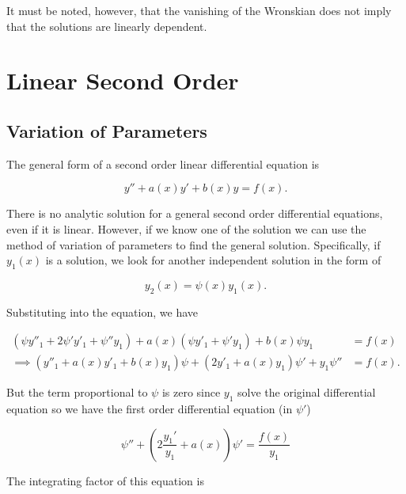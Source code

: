 \documentclass[english,a4paper,12pt]{report}
\begin{document}
It must be noted, however, that the vanishing of the Wronskian does not imply that the solutions are linearly dependent.

\section{Linear Second Order}

\subsection{Variation of Parameters}\label{vp} 

The general form of a second order linear differential equation is

\begin{equation}
    y'' + a(x) y' + b(x)y = f(x).
\end{equation}

There is no analytic solution for a general second order differential equations, even if it is linear. However, if we know one of the solution we can use the method of variation of parameters to find the general solution. Specifically, if \(y_1 (x)\) is a solution, we look for another independent solution in the form of

\begin{equation}
    y_{2} (x) = \psi (x) y_{1}(x).   
\end{equation}

Substituting into the equation, we have

\begin{equation}
    \begin{aligned}
     (\psi y''_{1} + 2\psi 'y'_{1} + \psi ''y_{1}) + a(x) (\psi y'_{1} + \psi ' y_{1}) + b(x) \psi y_{1} &= f(x) \\
    \implies ( y''_{1} + a(x) y'_{1} + b(x)y_{1}   ) \psi + (2 y'_{1} + a(x) y_{1}) \psi ' +  y_{1}\psi '' &= f(x). 
    \end{aligned}
\end{equation}

But the term proportional to \(\psi \) is zero since \(y_{1} \) solve the original differential equation so we have the first order differential equation (in \(\psi '\))

\begin{equation} \label{psi'} 
    \psi '' + \left( 2 \frac{y_1 '}{y_1 } + a(x)  \right) \psi' = \frac{f(x)}{y_1} 
\end{equation}

The integrating factor of this equation is 
\end{document}
